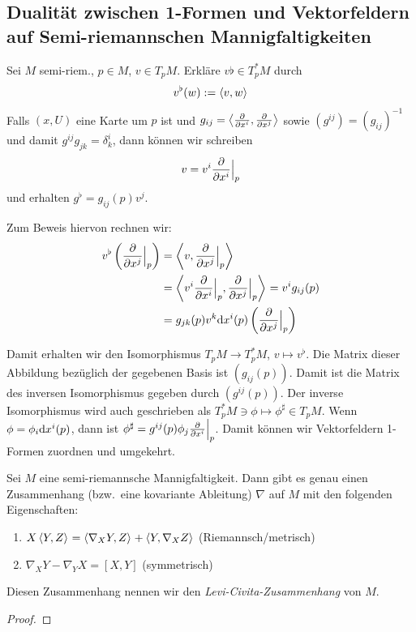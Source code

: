 \documentclass{skript}
\begin{document}
\subsection{Dualität zwischen 1-Formen und Vektorfeldern auf Semi-riemannschen
Mannigfaltigkeiten}
Sei $M$ semi-riem., $p\in M$, $v\in T_pM$. Erkläre $v\flat\in T_p^*M$ durch
\begin{align*}
  v^\flat(w) := \sprod{v,w}
\end{align*}
Falls $(x,U)$ eine Karte um $p$ ist und $g_{ij} = \sprod{\del{i},\del{j}}$ sowie
$(g^{ij}) = (g_{ij})^{-1}$ und damit $g^{ij}g_{jk} = \delta_k^i$, dann können
wir schreiben
\begin{align*}
  v = v^i\del{i}\Big|_p
\end{align*}
und erhalten $g^\flat = g_{ij}(p)v^j$.

Zum Beweis hiervon rechnen wir:
\begin{align*}
  v^\flat\left( \del{j}\Big|_p \right) &= \sprod{v,\del{j}\Big|_p} \\
  &= \sprod{v^i\del{i}\Big|_p, \del{j}\Big|_p} = v^ig_{ij}(p) \\
  &= g_{jk}(p)v^k\d x^i(p)\left( \del{j}\Big|_p \right)
\end{align*}

Damit erhalten wir den Isomorphismus $T_pM\to T_p^*M$, $v\mapsto v^\flat$. Die
Matrix dieser Abbildung bezüglich der gegebenen Basis ist $\left( g_{ij}(p)
\right)$. Damit ist die Matrix des inversen Isomorphismus gegeben durch $\left(
g^{ij}(p) \right)$. Der inverse Isomorphismus wird auch geschrieben als
$T_p^*M\ni \phi \mapsto \phi^\sharp\in T_pM$. Wenn $\phi = \phi_i\mathrm d x^i(p)$,
dann ist $\phi^\sharp= g^{ij}(p)\phi_j\del{i}\Big|_p$. Damit können wir
Vektorfeldern 1-Formen zuordnen und umgekehrt.

\begin{stz}
  Sei $M$ eine semi-riemannsche Mannigfaltigkeit. Dann gibt es genau einen
  Zusammenhang (bzw.\ eine kovariante Ableitung) $\nabla$ auf $M$ mit den
  folgenden Eigenschaften:
  \begin{enumerate}
    \item $X\sprod{Y,Z} = \sprod{\nabla_XY,Z} + \sprod{Y,\nabla_XZ}$
      (Riemannsch/metrisch)
    \item $\nabla_XY-\nabla_YX = [X,Y]$ (symmetrisch)
  \end{enumerate}
  Diesen Zusammenhang nennen wir den \emph{Levi-Civita-Zusammenhang} von $M$.
  \begin{proof}
    
  \end{proof}
\end{stz}
\end{document}
